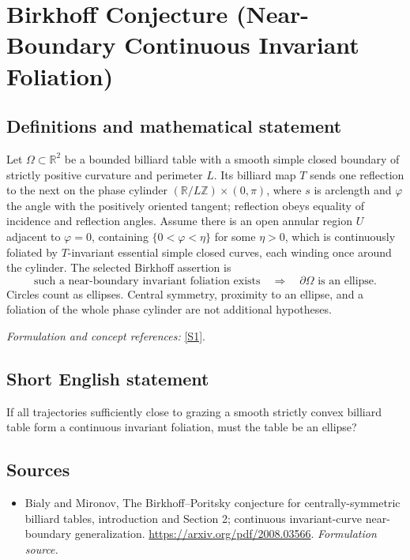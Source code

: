 \documentclass[11pt]{article}
\begin{document}
\section*{\texorpdfstring{Birkhoff Conjecture (Near-Boundary Continuous Invariant Foliation)}{Birkhoff Conjecture (Near-Boundary Continuous Invariant Foliation)}}\label{307}
\subsection{Definitions and mathematical statement}
Let $\Omega\subset{\mathbb{R}}^2$ be a bounded billiard table with a smooth simple closed boundary of strictly positive curvature and perimeter $L$. Its billiard map $T$ sends one reflection to the next on the phase cylinder $({\mathbb{R}}/L{\mathbb{Z}})\times(0,\pi)$, where $s$ is arclength and $\varphi$ the angle with the positively oriented tangent; reflection obeys equality of incidence and reflection angles. Assume there is an open annular region $U$ adjacent to $\varphi=0$, containing $\{0<\varphi<\eta\}$ for some $\eta>0$, which is continuously foliated by $T$-invariant essential simple closed curves, each winding once around the cylinder. The selected Birkhoff assertion is
\[
 \text{such a near-boundary invariant foliation exists}
 \quad\Longrightarrow\quad\partial\Omega\text{ is an ellipse}.
\]
Circles count as ellipses. Central symmetry, proximity to an ellipse, and a foliation of the whole phase cylinder are not additional hypotheses.
\par\smallskip\textit{Formulation and concept references:} \href{https://arxiv.org/pdf/2008.03566}{[S1]}.

\subsection{Short English statement}
If all trajectories sufficiently close to grazing a smooth strictly convex billiard table form a continuous invariant foliation, must the table be an ellipse?
\subsection{Sources}
\begin{itemize}
\item[S1]Bialy and Mironov, The Birkhoff–Poritsky conjecture for centrally-symmetric billiard tables, introduction and Section 2; continuous invariant-curve near-boundary generalization.
\url{https://arxiv.org/pdf/2008.03566}.
\textit{Formulation source.}
\end{itemize}
\end{document}
